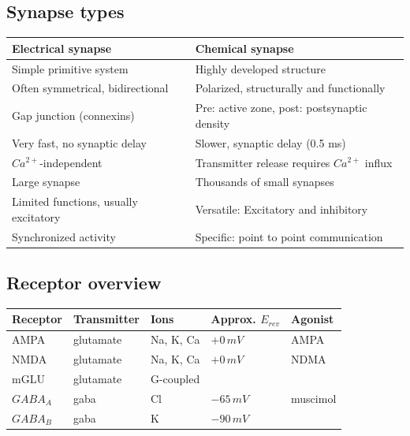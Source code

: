\documentclass[a4paper, 12pt]{article}
\begin{document}
\subsection{Synapse types}
\begin{tabular}{|l|l|}
	\hline
	\textbf{Electrical synapse} & \textbf{Chemical synapse}\\\hline
	Simple primitive system & Highly developed structure\\\hline
	Often symmetrical, bidirectional & Polarized, structurally and functionally\\\hline
	Gap junction (connexins) & Pre: active zone, post: postsynaptic density\\\hline
	Very fast, no synaptic delay & Slower, synaptic delay (0.5 ms)\\\hline
	$Ca^{2+}$-independent & Transmitter release requires $Ca^{2+}$ influx\\\hline
	Large synapse & Thousands of small synapses\\\hline
	Limited functions, usually excitatory & Versatile: Excitatory and inhibitory\\\hline
	Synchronized activity & Specific: point to point communication\\\hline
\end{tabular}

\subsection{Receptor overview}
\begin{tabular}{|l|l|l|l|l|}
	\hline
	\textbf{Receptor} & \textbf{Transmitter} & \textbf{Ions} & \textbf{Approx. $E_{rev}$} & \textbf{Agonist}\\\hline
	AMPA & glutamate & Na, K, Ca & $+0\,mV$ & AMPA\\\hline
	NMDA & glutamate & Na, K, Ca & $+0\,mV$ & NDMA\\\hline
	mGLU & glutamate & G-coupled & & \\\hline
	$GABA_A$ & gaba & Cl & $-65\,mV$ & muscimol\\\hline
	$GABA_B$ & gaba & K & $-90\,mV$ & \\\hline
\end{tabular}
\end{document}
